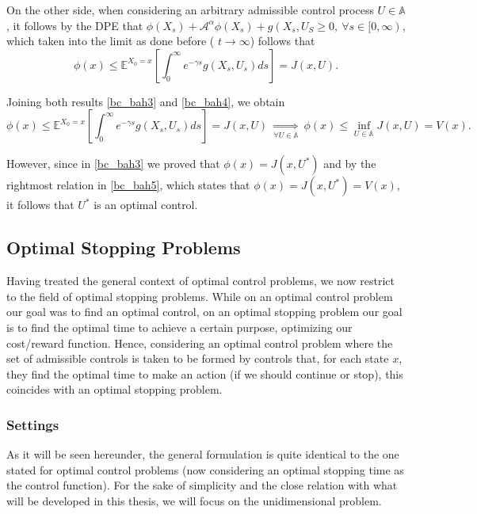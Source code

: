 On the other side, when considering an arbitrary admissible control process $U \in \mathds{A}$, it follows by the DPE that $\phi(X_s)+\mathcal{A}^\alpha \phi(X_s)+g(X_s,U_S \geq 0, \ \forall s \in [0, \infty)$, which taken into the limit as done before ( $t \rightarrow \infty$) follows that
\begin{equation}
\phi(x) \leq \mathds{E}^{X_0=x} \left[ \int^\infty_0 e^{-\gamma s}g(X_s,U_s)ds \right]=J(x,U).
\label{bc_bah4}
\end{equation}

Joining both results \eqref{bc_bah3} and \eqref{bc_bah4}, we obtain
\begin{equation}
\phi(x) \leq \mathds{E}^{X_0=x} \left[ \int^\infty_0 e^{-\gamma s}g(X_s,U_s)ds \right]=J(x,U) \ \underset{\forall U \in \mathds{A}}{\Rightarrow} \ \phi(x) \leq \inf_{U \in \mathds{A}} J(x,U)=V(x).
\label{bc_bah5}
\end{equation}

However, since in \eqref{bc_bah3} we proved that $\phi(x)=J(x,U^*)$ and by the rightmost relation in \eqref{bc_bah5}, which states that $\phi(x)=J(x,U^*)=V(x)$, it follows that $U^*$ is an optimal control.


\subsection{Optimal Stopping Problems}

Having treated the general context of optimal control problems, we now restrict to the field of optimal stopping problems. While on an optimal control problem our goal was to find an optimal control, on an optimal stopping problem our goal is to find the optimal time to achieve a certain purpose, optimizing our cost/reward function. Hence, considering an optimal control problem where the set of admissible controls is taken to be formed by controls that, for each state $x$, they find the optimal time to make an action (if we should continue or stop), this coincides with an optimal stopping problem.


\subsubsection{Settings}
  As it will be seen hereunder, the general formulation is quite identical to the one stated for optimal control problems (now considering an optimal stopping time as the control function).
 For the sake of simplicity and the close relation with what will be developed in this thesis, we will focus on the unidimensional problem.
 
